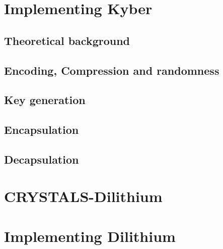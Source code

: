 \section{Implementing Kyber}
\label{sec:implementing_kyber}


\subsection{Theoretical background}
\label{subsec:kyber_theroteical}


\subsection{Encoding, Compression and randomness}
\label{subsec:kyber_enc_compr}


\subsection{Key generation}
\label{subsec:kyber_keygen}


\subsection{Encapsulation}
\label{subsec:kyber_enc}


\subsection{Decapsulation}
\label{subsec:kyber_dec}


\section{CRYSTALS-Dilithium}
\label{sec:dilithium}


\section{Implementing Dilithium}
\label{sec:implementing_dil}


